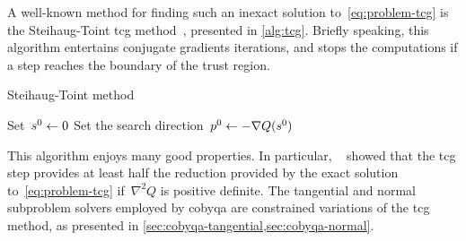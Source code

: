 A well-known method for finding such an inexact solution to~\cref{eq:problem-tcg} is the Steihaug-Toint \gls{tcg} method~\cite{Steihaug_1983,Toint_1981}, presented in \cref{alg:tcg}.
Briefly speaking, this algorithm entertains conjugate gradients iterations, and stops the computations if a step reaches the boundary of the trust region.

\begin{algorithm}
    \caption{Steihaug-Toint  method}
    \label{alg:tcg}
    \DontPrintSemicolon
    \onehalfspacing
    Set~$\sstep[0] \gets 0$\;
    Set the search direction~$\pstep[0] \gets -\nabla Q(\sstep[0])$\;
\end{algorithm}

This algorithm enjoys many good properties.
In particular, \citeauthor{Yuan_2000}~\cite{Yuan_2000} showed that the \gls{tcg} step provides at least half the reduction provided by the exact solution to~\cref{eq:problem-tcg} if~$\nabla^2 Q$ is positive definite.
The tangential and normal subproblem solvers employed by \gls{cobyqa} are constrained variations of the \gls{tcg} method, as presented in \cref{sec:cobyqa-tangential,sec:cobyqa-normal}.

